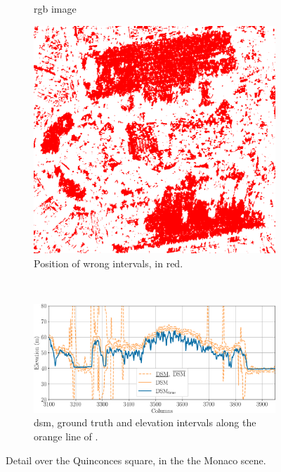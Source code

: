 \begin{figure}
\begin{subfigure}[t]{0.33\linewidth}
        \caption{\acrshort{rgb} image}
        \label{fig:Bordeaux_RGB}
    \end{subfigure}\hfill
    \begin{subfigure}[t]{0.33\linewidth}
        \flushright
        \includegraphics[width=\linewidth]{Images/Chap_6/Bordeaux_error_zoom.png}
        \caption{Position of wrong intervals, in red.}
        \label{fig:Bordeaux_wrong_intervals}
    \end{subfigure}\\
    \begin{subfigure}[t]{\linewidth}
        \flushright
        \includegraphics[width=\linewidth]{Images/Chap_6/Bordeaux_row_600.png}
        \caption{\acrshort{dsm}, ground truth and elevation intervals along the orange line of .}
        \label{fig:Bordeaux_row}
    \end{subfigure}
    \caption{Detail over the Quinconces square, in the the Monaco scene.}
    \label{fig:Bordeaux_zoom}
\end{figure}


